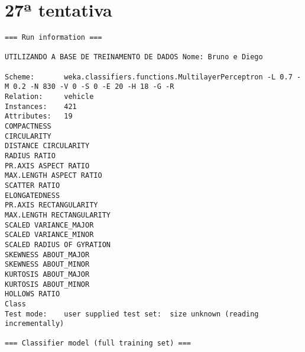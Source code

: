 \documentclass[
	article,			%
	11pt,				%
	oneside,			%
	a4paper,			%
	english,			%
	brazil,				%
	sumario=tradicional
	]{abntex2}
\begin{document}
\section{27ª tentativa}

\begin{lstlisting}
=== Run information ===

UTILIZANDO A BASE DE TREINAMENTO DE DADOS Nome: Bruno e Diego

Scheme:       weka.classifiers.functions.MultilayerPerceptron -L 0.7 -M 0.2 -N 830 -V 0 -S 0 -E 20 -H 18 -G -R
Relation:     vehicle
Instances:    421
Attributes:   19
COMPACTNESS
CIRCULARITY
DISTANCE CIRCULARITY
RADIUS RATIO
PR.AXIS ASPECT RATIO
MAX.LENGTH ASPECT RATIO
SCATTER RATIO
ELONGATEDNESS
PR.AXIS RECTANGULARITY
MAX.LENGTH RECTANGULARITY
SCALED VARIANCE_MAJOR
SCALED VARIANCE_MINOR
SCALED RADIUS OF GYRATION
SKEWNESS ABOUT_MAJOR
SKEWNESS ABOUT_MINOR
KURTOSIS ABOUT_MAJOR
KURTOSIS ABOUT_MINOR
HOLLOWS RATIO
Class
Test mode:    user supplied test set:  size unknown (reading incrementally)

=== Classifier model (full training set) ===


\end{lstlisting}
\end{document}
